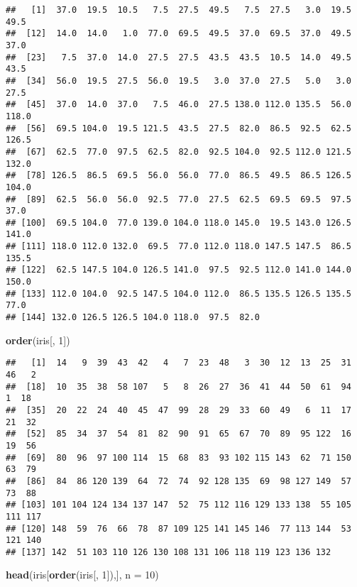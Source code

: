 \documentclass[]{book}
\newenvironment{Shaded}{\begin{snugshade}}{\end{snugshade}}
\newcommand{\KeywordTok}[1]{\textcolor[rgb]{0.13,0.29,0.53}{\textbf{#1}}}
\newcommand{\DataTypeTok}[1]{\textcolor[rgb]{0.13,0.29,0.53}{#1}}
\newcommand{\DecValTok}[1]{\textcolor[rgb]{0.00,0.00,0.81}{#1}}
\newcommand{\NormalTok}[1]{#1}
\theoremstyle{definition}
\theoremstyle{definition}
\theoremstyle{definition}
\theoremstyle{remark}
\begin{document}
\begin{verbatim}
##   [1]  37.0  19.5  10.5   7.5  27.5  49.5   7.5  27.5   3.0  19.5  49.5
##  [12]  14.0  14.0   1.0  77.0  69.5  49.5  37.0  69.5  37.0  49.5  37.0
##  [23]   7.5  37.0  14.0  27.5  27.5  43.5  43.5  10.5  14.0  49.5  43.5
##  [34]  56.0  19.5  27.5  56.0  19.5   3.0  37.0  27.5   5.0   3.0  27.5
##  [45]  37.0  14.0  37.0   7.5  46.0  27.5 138.0 112.0 135.5  56.0 118.0
##  [56]  69.5 104.0  19.5 121.5  43.5  27.5  82.0  86.5  92.5  62.5 126.5
##  [67]  62.5  77.0  97.5  62.5  82.0  92.5 104.0  92.5 112.0 121.5 132.0
##  [78] 126.5  86.5  69.5  56.0  56.0  77.0  86.5  49.5  86.5 126.5 104.0
##  [89]  62.5  56.0  56.0  92.5  77.0  27.5  62.5  69.5  69.5  97.5  37.0
## [100]  69.5 104.0  77.0 139.0 104.0 118.0 145.0  19.5 143.0 126.5 141.0
## [111] 118.0 112.0 132.0  69.5  77.0 112.0 118.0 147.5 147.5  86.5 135.5
## [122]  62.5 147.5 104.0 126.5 141.0  97.5  92.5 112.0 141.0 144.0 150.0
## [133] 112.0 104.0  92.5 147.5 104.0 112.0  86.5 135.5 126.5 135.5  77.0
## [144] 132.0 126.5 126.5 104.0 118.0  97.5  82.0
\end{verbatim}

\begin{Shaded}
\begin{Highlighting}[]
\KeywordTok{order}\NormalTok{(iris[, }\DecValTok{1}\NormalTok{])}
\end{Highlighting}
\end{Shaded}

\begin{verbatim}
##   [1]  14   9  39  43  42   4   7  23  48   3  30  12  13  25  31  46   2
##  [18]  10  35  38  58 107   5   8  26  27  36  41  44  50  61  94   1  18
##  [35]  20  22  24  40  45  47  99  28  29  33  60  49   6  11  17  21  32
##  [52]  85  34  37  54  81  82  90  91  65  67  70  89  95 122  16  19  56
##  [69]  80  96  97 100 114  15  68  83  93 102 115 143  62  71 150  63  79
##  [86]  84  86 120 139  64  72  74  92 128 135  69  98 127 149  57  73  88
## [103] 101 104 124 134 137 147  52  75 112 116 129 133 138  55 105 111 117
## [120] 148  59  76  66  78  87 109 125 141 145 146  77 113 144  53 121 140
## [137] 142  51 103 110 126 130 108 131 106 118 119 123 136 132
\end{verbatim}

\begin{Shaded}
\begin{Highlighting}[]
\KeywordTok{head}\NormalTok{(iris[}\KeywordTok{order}\NormalTok{(iris[, }\DecValTok{1}\NormalTok{]),], }\DataTypeTok{n =} \DecValTok{10}\NormalTok{)}
\end{Highlighting}
\end{Shaded}
\end{document}
